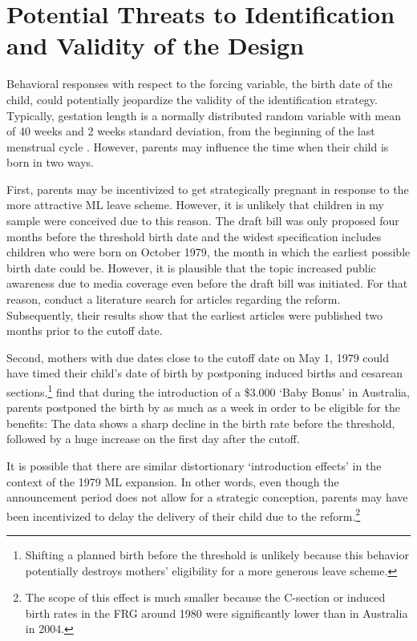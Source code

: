 





\bigskip
\section*{Potential Threats to Identification and Validity of the Design}\label{sec_mlch:empirical_strategy_threats+validity}
Behavioral responses with respect to the forcing variable, the birth date of the child, could potentially jeopardize the validity of the identification strategy. Typically, gestation length is a normally distributed random variable with mean of 40 weeks and 2 weeks standard deviation, from the beginning of the last menstrual cycle \citep{Ekberg2013parental}. However, parents may influence the time when their child is born in two ways. 

First, parents may be incentivized to get strategically pregnant in response to the more attractive ML leave scheme. However, it is unlikely that children in my sample were conceived due to this reason. The draft bill was only proposed four months before the threshold birth date and the widest specification includes children who were born on October 1979, the month in which the earliest possible birth date could be. However, it is plausible that the topic increased public awareness due to media coverage even before the draft bill was initiated. For that reason, \cite{Dustmann2012} conduct a literature search for articles regarding the reform. Subsequently, their results show that the earliest articles were published two months prior to the cutoff date.

Second, mothers with due dates close to the cutoff date on May 1, 1979 could have timed their child's date of birth by postponing induced births and cesarean sections.\footnote{Shifting a planned birth before the threshold is unlikely because this behavior potentially destroys mothers' eligibility for a more generous leave scheme.} \cite{gans2009born} find that during the introduction of a \$3.000 `Baby Bonus' in Australia, parents postponed the birth by as much as a week in order to be eligible for the benefits: The data shows a sharp decline in the birth rate before the threshold, followed by a huge increase on the first day after the cutoff.

It is possible that there are similar distortionary `introduction effects' in the context of the 1979 ML expansion. In other words, even though the announcement period does not allow for a strategic conception, parents may have been incentivized to delay the delivery of their child due to the reform.\footnote{The scope of this effect is much smaller because the C-section or induced birth rates in the FRG around 1980 were significantly lower than in Australia in 2004.} %


